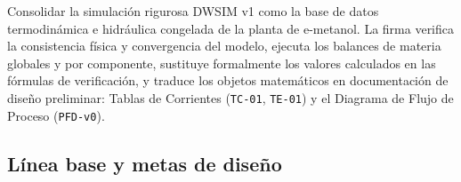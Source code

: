 \documentclass[11pt,letterpaper]{article}
\begin{document}
\begin{propositobox}
Consolidar la simulación rigurosa DWSIM v1 como la base de datos termodinámica e hidráulica congelada de la planta de e-metanol. La firma verifica la consistencia física y convergencia del modelo, ejecuta los balances de materia globales y por componente, sustituye formalmente los valores calculados en las fórmulas de verificación, y traduce los objetos matemáticos en documentación de diseño preliminar: Tablas de Corrientes (\texttt{TC-01}, \texttt{TE-01}) y el Diagrama de Flujo de Proceso (\texttt{PFD-v0}).
\end{propositobox}

\vspace{0.2cm}
\subsection{Línea base y metas de diseño}
\end{document}
